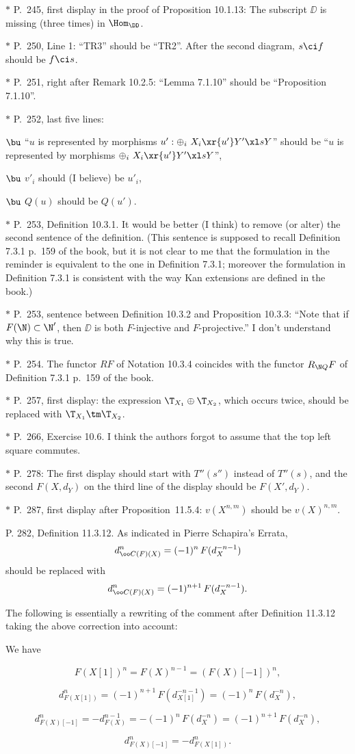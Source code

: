 \documentclass[12pt]{article}
\theoremstyle{remark}
\theoremstyle{definition}
\begin{document}
\nn$*$ P.~245, first display in the proof of Proposition 10.1.13: The subscript $\DD$ is missing (three times) in $\Hom_\DD$.

\nn$*$ P.~250, Line 1: ``TR3'' should be ``TR2''. After the second diagram, $s\ci f$ should be $f\ci s$.

\nn$*$ P.~251, right after Remark 10.2.5: ``Lemma 7.1.10'' should be ``Proposition 7.1.10''.

\nn$*$ P.~252, last five lines:

$\bu$ ``$u$ is represented by morphisms $u':\oplus_i\ X_i\xr{u'}Y'\xl sY$'' should be ``$u$ is represented by morphisms $\oplus_i\ X_i\xr{u'}Y'\xl sY$'',

$\bu$ $v'_i$ should (I believe) be $u'_i$,

$\bu$ $Q(u)$ should be $Q(u')$.

\nn$*$ P.~253, Definition 10.3.1. It would be better (I think) to remove (or alter) the second sentence of the definition. (This sentence is supposed to recall Definition 7.3.1 p.~159 of the book, but it is not clear to me that the formulation in the reminder is equivalent to the one in Definition 7.3.1; moreover the formulation in Definition 7.3.1 is consistent with the way Kan extensions are defined in the book.)

\nn$*$ P.~253, sentence between Definition 10.3.2 and Proposition 10.3.3: ``Note that if $F(\N)\subset\N'$, then $\DD$ is both $F$-injective and $F$-projective.'' I don't understand why this is true.

\nn$*$ P.~254. The functor $RF$ of Notation 10.3.4 coincides with the functor $R_{\N Q}F$ of Definition 7.3.1 p.~159 of the book.

\nn$*$ P.~257, first display: the expression $\T_{X_1}\oplus\T_{X_2}$, which occurs twice, should be replaced with $\T_{X_1}\tm\T_{X_2}$.

\nn$*$ P.~266, Exercise 10.6. I think the authors forgot to assume that the top left square commutes.

\nn$*$ P.~278: The first display should start with $T''(s'')$ instead of $T''(s)$, and the second $F(X,d_Y)$ on the third line of the display should be $F(X',d_Y)$.

\nn$*$ P.~287, first display after Proposition~11.5.4: $v(X^{n,m})$ should be $v(X)^{n,m}$.

\begin{s}
P. 282, Definition 11.3.12. As indicated in Pierre Schapira's Errata, 
$$
d^n_{\oo C(F)(X)}=(-1)^n\,F(d_X^{-n-1})
$$ 
should be replaced with 
$$
d^n_{\oo C(F)(X)}=(-1)^{n+1}\,F(d_X^{-n-1}).
$$ 

The following is essentially a rewriting of the comment after Definition 11.3.12 taking the above correction into account:

We have 

$$F(X[1])^n=F(X)^{n-1}=(F(X)[-1])^n,$$ 

$$d^n_{F(X[1])}=(-1)^{n+1}\,F(d_{X[1]}^{-n-1})=(-1)^n\,F(d_X^{-n}),$$ 

$$d^n_{F(X)[-1]}=-d_{F(X)}^{n-1}=-(-1)^n\,F(d_X^{-n})=(-1)^{n+1}\,F(d_X^{-n}),$$ 

$$d^n_{F(X)[-1]}=-d^n_{F(X[1])}.$$
\end{s}
\end{document}
